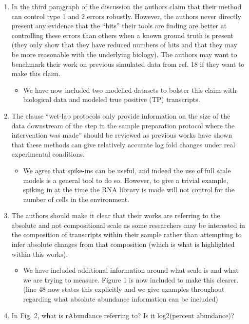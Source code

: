 \documentclass[
]{article}
\providecommand{\tightlist}{%
  \setlength{\itemsep}{0pt}\setlength{\parskip}{0pt}}
\begin{document}
\begin{enumerate}
\def\labelenumi{\arabic{enumi}.}
\setcounter{enumi}{3}
\item
  In the third paragraph of the discussion the authors claim that their
  method can control type 1 and 2 errors robustly. However, the authors
  never directly present any evidence that the ``hits'' their tools are
  finding are better at controlling these errors than others when a
  known ground truth is present (they only show that they have reduced
  numbers of hits and that they may be more reasonable with the
  underlying biology). The authors may want to benchmark their work on
  previous simulated data from ref. 18 if they want to make this claim.

  \begin{itemize}
  \tightlist
  \item
    We have now included two modelled datasets to bolster this claim
    with biological data and modeled true positive (TP) transcripts.
  \end{itemize}
\item
  The clause ``wet-lab protocols only provide information on the size of
  the data downstream of the step in the sample preparation protocol
  where the intervention was made'' should be reviewed as previous works
  have shown that these methods can give relatively accurate log fold
  changes under real experimental conditions.

  \begin{itemize}
  \tightlist
  \item
    We agree that spike-ins can be useful, and indeed the use of full
    scale models is a general tool to do so. However, to give a trivial
    example, spiking in at the time the RNA library is made will not
    control for the number of cells in the environment.
  \end{itemize}
\item
  The authors should make it clear that their works are referring to the
  absolute and not compositional scale as some researchers may be
  interested in the composition of transcripts within their sample
  rather than attempting to infer absolute changes from that composition
  (which is what is highlighted within this works).

  \begin{itemize}
  \tightlist
  \item
    We have included additional information around what scale is and
    what we are trying to measure. Figure 1 is now included to make this
    clearer. (line 48 now states this explicitly and we give examples
    throughout regarding what absolute abundance information can be
    included)
  \end{itemize}
\item
  In Fig. 2, what is rAbundance referring to? Is it log2(percent
  abundance)?


\end{enumerate}
\end{document}
